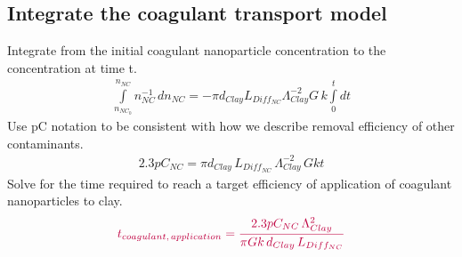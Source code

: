 \documentclass[letterpaper,10pt,english]{sphinxmanual}
\begin{document}
\subsection{Integrate the coagulant transport model}
\label{\detokenize{Rapid_Mix/RM_Derivations:integrate-the-coagulant-transport-model}}\label{\detokenize{Rapid_Mix/RM_Derivations:heading-integrate-the-coagulant-transport-model}}
Integrate from the initial coagulant nanoparticle concentration to the concentration at time t.
\begin{equation}\label{equation:Rapid_Mix/RM_Derivations:Rapid_Mix/RM_Derivations:11}
\begin{split}\int \limits_{n_{NC_0}}^{n_{NC}} n_{NC}^{- 1} \, dn_{NC}  =  - \pi d_{Clay} L_{Diff_{NC}} \Lambda^{-2}_{Clay} G \, k  \int \limits_0^t {dt}\end{split}
\end{equation}
Use pC notation to be consistent with how we describe removal efficiency of other contaminants.
\begin{equation}\label{equation:Rapid_Mix/RM_Derivations:Rapid_Mix/RM_Derivations:12}
\begin{split}2.3 p C_{NC} = \pi d_{Clay}\,  L_{Diff_{NC}}\,  \Lambda^{-2}_{Clay}\,  G k  t\end{split}
\end{equation}
Solve for the time required to reach a target efficiency of application of coagulant nanoparticles to clay.
\begin{equation}\label{equation:Rapid_Mix/RM_Derivations:Rapid_Mix/RM_Derivations:13}
\begin{split}\color{purple}{
   t_{coagulant, \, application} = \frac{2.3p C_{NC} \, \Lambda_{Clay}^2}{\pi G k \, d_{Clay}\,  L_{Diff_{NC}} }
 }\end{split}
\end{equation}
\end{document}
